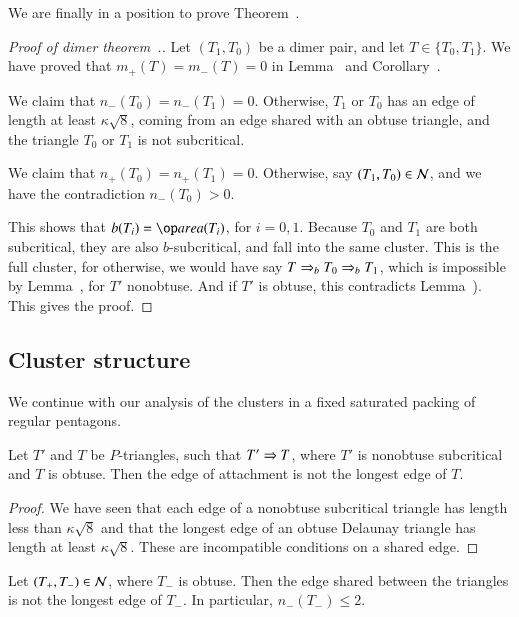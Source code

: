 We are finally in a position to prove Theorem~.

\begin{proof}[Proof of dimer theorem~.]
  Let $(T_1,T_0)$ be a dimer pair, and let $T\in \{T_0,T_1\}$.  We
  have proved that $m_+(T)=m_-(T)=0$ in Lemma~ and
  Corollary~.

  We claim that $n_-(T_0)=n_-(T_1)=0$.  Otherwise, $T_1$ or $T_0$ has
  an edge of length at least $\kappa\sqrt8$, coming from an edge
  shared with an obtuse triangle, and the triangle $T_0$ or $T_1$ is
  not subcritical.

  We claim that $n_+(T_0)=n_+(T_1)=0$.  Otherwise, say
  $(T_1,T_0)\in\mathcal N$, and we have the contradiction $n_-(T_0)>0$.

  This shows that $b(T_i)=\area(T_i)$, for $i=0,1$.  Because $T_0$ and
  $T_1$ are both subcritical, they are also $b$-subcritical, and fall
  into the same cluster.  This is the full cluster, for otherwise, we
  would have say $T\Rightarrow_{b} T_0\Rightarrow_{b} T_1$, which is impossible by
  Lemma~, for $T'$ nonobtuse.  And if $T'$ is
  obtuse, this contradicts Lemma~).
  This gives the proof.
\end{proof}


\subsection{Cluster structure}




We continue with our analysis of the clusters in a fixed saturated
packing of regular pentagons.  

\begin{lemma}  
  Let $T'$ and $T$ be $P$-triangles, such that $T'\Rightarrow T$, where
  $T'$ is nonobtuse subcritical and $T$ is obtuse.  Then the edge
  of attachment is not the longest edge of $T$.
\end{lemma}

\begin{proof} We have seen that each edge of a nonobtuse subcritical
  triangle has length less than $\kappa\sqrt8$ and that the longest
  edge of an obtuse Delaunay triangle has length at least
  $\kappa\sqrt{8}$.  These are incompatible conditions on a shared
  edge.
\end{proof}

\begin{corollary} 
  Let $(T_+,T_-)\in\mathcal N$, where $T_-$ is obtuse.  Then the edge shared
  between the triangles is not the longest edge of $T_-$.  In
  particular, $n_-(T_-)\le 2$.
\end{corollary}

